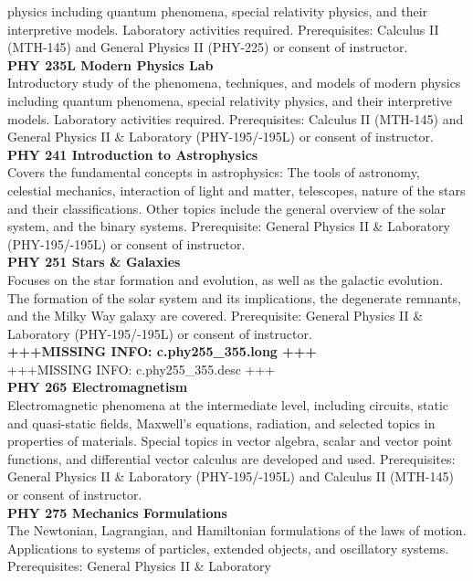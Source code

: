 \documentclass[
  letterpaper,
]{scrbook}
\begin{document}
physics including quantum phenomena, special relativity physics, and
their interpretive models. Laboratory activities required.
Prerequisites: Calculus II (MTH-145) and General Physics II (PHY-225) or
consent of instructor.\\
\textbf{PHY 235L Modern Physics Lab}\\
Introductory study of the phenomena, techniques, and models of modern
physics including quantum phenomena, special relativity physics, and
their interpretive models. Laboratory activities required.
Prerequisites: Calculus II (MTH-145) and General Physics II \&
Laboratory (PHY-195/-195L) or consent of instructor.\\
\textbf{PHY 241 Introduction to Astrophysics}\\
Covers the fundamental concepts in astrophysics: The tools of astronomy,
celestial mechanics, interaction of light and matter, telescopes, nature
of the stars and their classifications. Other topics include the general
overview of the solar system, and the binary systems. Prerequisite:
General Physics II \& Laboratory (PHY-195/-195L) or consent of
instructor.\\
\textbf{PHY 251 Stars \& Galaxies}\\
Focuses on the star formation and evolution, as well as the galactic
evolution. The formation of the solar system and its implications, the
degenerate remnants, and the Milky Way galaxy are covered. Prerequisite:
General Physics II \& Laboratory (PHY-195/-195L) or consent of
instructor.\\
\textbf{+++MISSING INFO: c.phy255\_355.long +++}\\
+++MISSING INFO: c.phy255\_355.desc +++\\
\textbf{PHY 265 Electromagnetism}\\
Electromagnetic phenomena at the intermediate level, including circuits,
static and quasi-static fields, Maxwell's equations, radiation, and
selected topics in properties of materials. Special topics in vector
algebra, scalar and vector point functions, and differential vector
calculus are developed and used. Prerequisites: General Physics II \&
Laboratory (PHY-195/-195L) and Calculus II (MTH-145) or consent of
instructor.\\
\textbf{PHY 275 Mechanics Formulations}\\
The Newtonian, Lagrangian, and Hamiltonian formulations of the laws of
motion. Applications to systems of particles, extended objects, and
oscillatory systems. Prerequisites: General Physics II \& Laboratory
\end{document}
